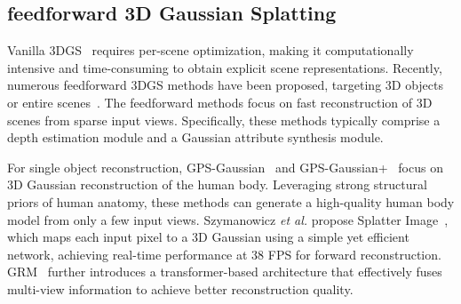 \documentclass[lettersize,journal]{IEEEtran}
\begin{document}
\subsection{feedforward 3D Gaussian Splatting}
Vanilla 3DGS~\cite{3dgs_vanilla} requires per-scene optimization, making it computationally intensive and time-consuming to obtain explicit scene representations. Recently, numerous feedforward 3DGS methods have been proposed, targeting 3D objects~\cite{szymanowicz2024splatter, tang2024lgm, zhou2024gpsplus, zheng2024gps, xu2024grm} or entire scenes~\cite{pixelsplat, noposplat, chen2024lara, szymanowicz2024flash3d, wewer2024latentsplat, min2024epipolar, chen2024mvsplat360, xu2024depthsplat, chen2024pref3r}. The feedforward methods focus on fast reconstruction of 3D scenes from sparse input views.
Specifically, these methods typically comprise a depth estimation module and a Gaussian attribute synthesis module. 

For single object reconstruction, GPS-Gaussian~\cite{zheng2024gps} and GPS-Gaussian+~\cite{zhou2024gpsplus} focus on 3D Gaussian reconstruction of the human body. Leveraging strong structural priors of human anatomy, these methods can generate a high-quality human body model from only a few input views. Szymanowicz \textit{et al.} propose Splatter Image~\cite{szymanowicz2024splatter}, which maps each input pixel to a 3D Gaussian using a simple yet efficient network, achieving real-time performance at 38 FPS for forward reconstruction. GRM~\cite{xu2024grm} further introduces a transformer-based architecture that effectively fuses multi-view information to achieve better reconstruction quality.
\end{document}
